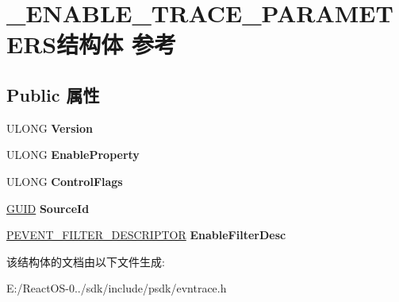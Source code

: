\hypertarget{struct___e_n_a_b_l_e___t_r_a_c_e___p_a_r_a_m_e_t_e_r_s}{}\section{\+\_\+\+E\+N\+A\+B\+L\+E\+\_\+\+T\+R\+A\+C\+E\+\_\+\+P\+A\+R\+A\+M\+E\+T\+E\+R\+S结构体 参考}
\label{struct___e_n_a_b_l_e___t_r_a_c_e___p_a_r_a_m_e_t_e_r_s}
\subsection*{Public 属性}
\begin{DoxyCompactItemize}
\item 
\mbox{\label{struct___e_n_a_b_l_e___t_r_a_c_e___p_a_r_a_m_e_t_e_r_s_ae7418f601c5109f3e703cd4822dc96ee}} 
U\+L\+O\+NG {\bfseries Version}
\item 
\mbox{\label{struct___e_n_a_b_l_e___t_r_a_c_e___p_a_r_a_m_e_t_e_r_s_a119fcb3c98886b5879bb8d6352084a3f}} 
U\+L\+O\+NG {\bfseries Enable\+Property}
\item 
\mbox{\label{struct___e_n_a_b_l_e___t_r_a_c_e___p_a_r_a_m_e_t_e_r_s_ae84efb74b53d675e6511813ca7965144}} 
U\+L\+O\+NG {\bfseries Control\+Flags}
\item 
\mbox{\label{struct___e_n_a_b_l_e___t_r_a_c_e___p_a_r_a_m_e_t_e_r_s_ab94c496de4adeb30928bd00baf2f919c}} 
\hyperlink{interface_g_u_i_d}{G\+U\+ID} {\bfseries Source\+Id}
\item 
\mbox{\label{struct___e_n_a_b_l_e___t_r_a_c_e___p_a_r_a_m_e_t_e_r_s_a97308742ad32c0748286e692b1d9e51f}} 
\hyperlink{struct___e_v_e_n_t___f_i_l_t_e_r___d_e_s_c_r_i_p_t_o_r}{P\+E\+V\+E\+N\+T\+\_\+\+F\+I\+L\+T\+E\+R\+\_\+\+D\+E\+S\+C\+R\+I\+P\+T\+OR} {\bfseries Enable\+Filter\+Desc}
\end{DoxyCompactItemize}


该结构体的文档由以下文件生成\+:\begin{DoxyCompactItemize}
\item 
E\+:/\+React\+O\+S-\/0../sdk/include/psdk/evntrace.\+h\end{DoxyCompactItemize}
